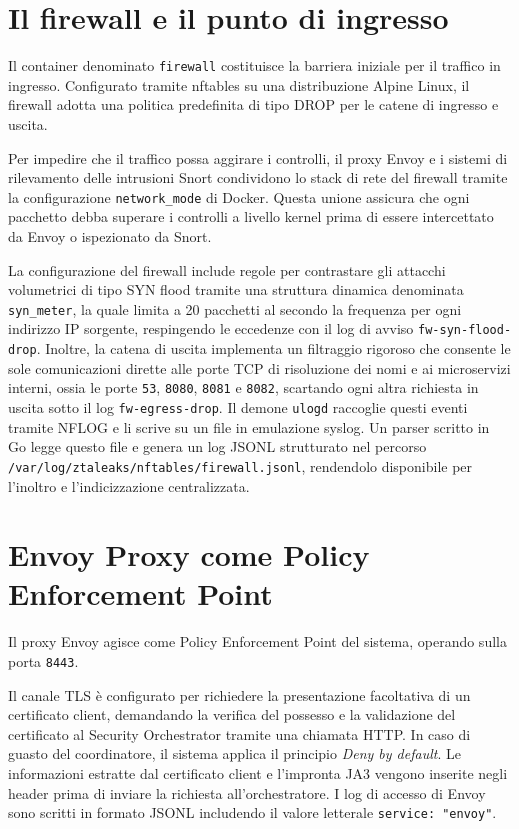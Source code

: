 \section{Il firewall e il punto di ingresso}

Il container denominato \texttt{firewall} costituisce la barriera iniziale per il traffico in ingresso. Configurato tramite nftables su una distribuzione Alpine Linux, il firewall adotta una politica predefinita di tipo DROP per le catene di ingresso e uscita.

Per impedire che il traffico possa aggirare i controlli, il proxy Envoy e i sistemi di rilevamento delle intrusioni Snort condividono lo stack di rete del firewall tramite la configurazione \texttt{network\_mode} di Docker. Questa unione assicura che ogni pacchetto debba superare i controlli a livello kernel prima di essere intercettato da Envoy o ispezionato da Snort.

La configurazione del firewall include regole per contrastare gli attacchi volumetrici di tipo SYN flood tramite una struttura dinamica denominata \texttt{syn\_meter}, la quale limita a 20 pacchetti al secondo la frequenza per ogni indirizzo IP sorgente, respingendo le eccedenze con il log di avviso \texttt{fw-syn-flood-drop}. Inoltre, la catena di uscita implementa un filtraggio rigoroso che consente le sole comunicazioni dirette alle porte TCP di risoluzione dei nomi e ai microservizi interni, ossia le porte \texttt{53}, \texttt{8080}, \texttt{8081} e \texttt{8082}, scartando ogni altra richiesta in uscita sotto il log \texttt{fw-egress-drop}. Il demone \texttt{ulogd} raccoglie questi eventi tramite NFLOG e li scrive su un file in emulazione syslog. Un parser scritto in Go legge questo file e genera un log JSONL strutturato nel percorso \texttt{/var/log/ztaleaks/nftables/firewall.jsonl}, rendendolo disponibile per l'inoltro e l'indicizzazione centralizzata.

\section{Envoy Proxy come Policy Enforcement Point}

Il proxy Envoy agisce come Policy Enforcement Point del sistema, operando sulla porta \texttt{8443}. 

Il canale TLS è configurato per richiedere la presentazione facoltativa di un certificato client, demandando la verifica del possesso e la validazione del certificato al Security Orchestrator tramite una chiamata HTTP. In caso di guasto del coordinatore, il sistema applica il principio \textit{Deny by default}. 
Le informazioni estratte dal certificato client e l'impronta JA3 vengono inserite negli header prima di inviare la richiesta all'orchestratore. I log di accesso di Envoy sono scritti in formato JSONL includendo il valore letterale \texttt{service: "envoy"}.

